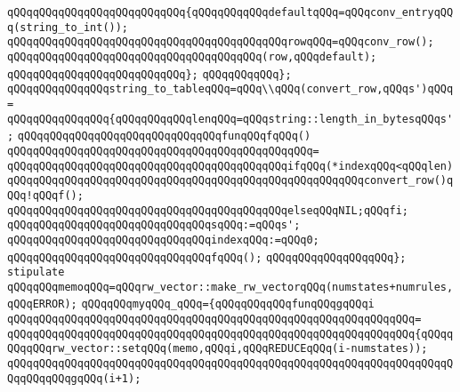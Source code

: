 \verb|qQQqqQQqqQQqqQQqqQQqqQQqqQQq{qQQqqQQqqQQqdefaultqQQq=qQQqconv_entryqQQq(string_to_int());|\newline
\verb|qQQqqQQqqQQqqQQqqQQqqQQqqQQqqQQqqQQqqQQqqQQqrowqQQq=qQQqconv_row();|\newline
\verb|qQQqqQQqqQQqqQQqqQQqqQQqqQQqqQQqqQQqqQQq(row,qQQqdefault);|\newline
\verb|qQQqqQQqqQQqqQQqqQQqqQQqqQQq};|\newline
\verb|qQQqqQQqqQQq};|\newline
\newline
\verb|qQQqqQQqqQQqqQQqstring_to_tableqQQq=qQQq\\qQQq(convert_row,qQQqs')qQQq=|\newline
\verb|qQQqqQQqqQQqqQQq{qQQqqQQqqQQqlenqQQq=qQQqstring::length_in_bytesqQQqs';|\newline
\verb|qQQqqQQqqQQqqQQqqQQqqQQqqQQqqQQqfunqQQqfqQQq()|\newline
\verb|qQQqqQQqqQQqqQQqqQQqqQQqqQQqqQQqqQQqqQQqqQQqqQQq=|\newline
\verb|qQQqqQQqqQQqqQQqqQQqqQQqqQQqqQQqqQQqqQQqqQQqifqQQq(*indexqQQq<qQQqlen)|\newline
\verb|qQQqqQQqqQQqqQQqqQQqqQQqqQQqqQQqqQQqqQQqqQQqqQQqqQQqqQQqconvert_row()qQQq!qQQqf();|\newline
\verb|qQQqqQQqqQQqqQQqqQQqqQQqqQQqqQQqqQQqqQQqqQQqelseqQQqNIL;qQQqfi;|\newline
\verb|qQQqqQQqqQQqqQQqqQQqqQQqqQQqqQQqsqQQq:=qQQqs';|\newline
\verb|qQQqqQQqqQQqqQQqqQQqqQQqqQQqqQQqindexqQQq:=qQQq0;|\newline
\verb|qQQqqQQqqQQqqQQqqQQqqQQqqQQqqQQqfqQQq();|\newline
\verb|qQQqqQQqqQQqqQQqqQQq};|\newline
\newline
\verb|stipulate|\newline
\verb|qQQqqQQqmemoqQQq=qQQqrw_vector::make_rw_vectorqQQq(numstates+numrules,qQQqERROR);|\newline
\verb|qQQqqQQqmyqQQq_qQQq={qQQqqQQqqQQqfunqQQqgqQQqi|\newline
\verb|qQQqqQQqqQQqqQQqqQQqqQQqqQQqqQQqqQQqqQQqqQQqqQQqqQQqqQQqqQQqqQQq=|\newline
\verb|qQQqqQQqqQQqqQQqqQQqqQQqqQQqqQQqqQQqqQQqqQQqqQQqqQQqqQQqqQQqqQQq{qQQqqQQqqQQqrw_vector::setqQQq(memo,qQQqi,qQQqREDUCEqQQq(i-numstates));|\newline
\verb|qQQqqQQqqQQqqQQqqQQqqQQqqQQqqQQqqQQqqQQqqQQqqQQqqQQqqQQqqQQqqQQqqQQqqQQqqQQqqQQqgqQQq(i+1);|\newline
